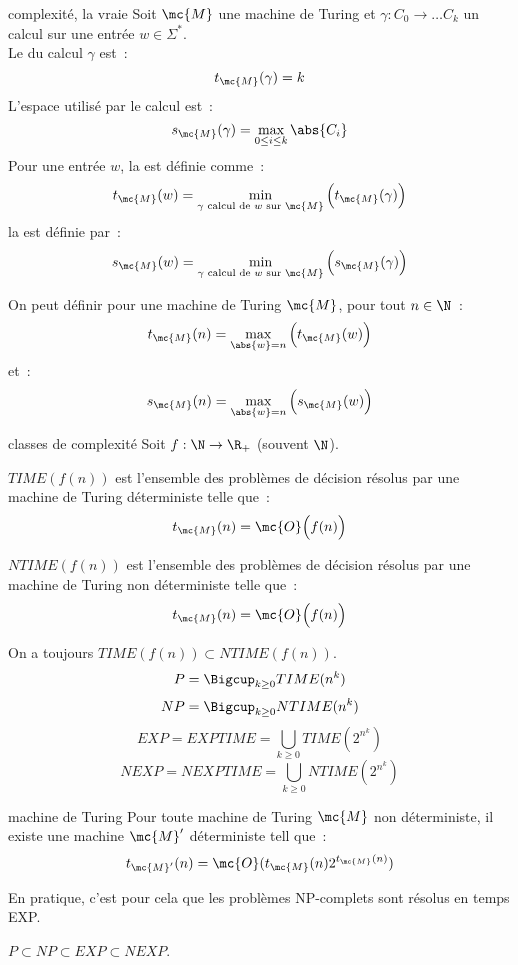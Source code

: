 \begin{definition}{}{complexité, la vraie}
    Soit $\mc{M}$ une machine de Turing et $\gamma : C_0 \to \dots C_k$ un calcul sur une entrée $w \in \Sigma^*$.\\
    Le  du calcul $\gamma$ est~:
    $$t_\mc{M}(\gamma) = k$$
    L'espace utilisé par le calcul est~:
    $$s_\mc{M}(\gamma) = \max_{0\leq i \leq k} \abs{C_i}$$
    Pour une entrée $w$, la  est définie comme~:
    $$t_\mc{M}(w) = \min_{\gamma \text{ calcul de $w$ sur $\mc{M}$}} \Big(t_\mc{M}(\gamma)\Big)$$
    la  est définie par~:
    $$s_\mc{M}(w) = \min_{\gamma \text{ calcul de $w$ sur $\mc{M}$}} \Big(s_\mc{M}(\gamma)\Big)$$
\end{definition}

\begin{remarque}{}{}
    On peut définir pour une machine de Turing $\mc{M}$, pour tout $n \in \N$~:
    $$t_\mc{M}(n) = \max_{\abs{w} = n}\Big(t_\mc{M}(w)\Big)$$
    et~:
    $$s_\mc{M}(n) = \max_{\abs{w} = n}\Big(s_\mc{M}(w)\Big)$$
\end{remarque}

\begin{definition}{}{classes de complexité}
    Soit $f : \N \to \R_+$ (souvent $\N$).
    \begin{enumeratebf}
        \item $TIME(f(n))$ est l'ensemble des problèmes de décision résolus par une machine de Turing déterministe telle que~:
         $$t_\mc{M}(n) = \mc{O}\Big(f(n)\Big)$$
        \item $NTIME(f(n))$ est l'ensemble des problèmes de décision résolus par une machine de Turing non déterministe telle que~:
        $$t_\mc{M}(n) = \mc{O}\Big(f(n)\Big)$$
        \item On a toujours $TIME(f(n)) \subset NTIME(f(n))$.\\
        $$P = \Bigcup_{k \geq 0}TIME(n^k)$$
        $$NP = \Bigcup_{k \geq 0}NTIME(n^k)$$
        $$EXP = EXPTIME = \bigcup_{k \geq 0} TIME(2^{n^k})$$
        $$NEXP = NEXPTIME = \bigcup_{k \geq 0} NTIME(2^{n^k})$$
    \end{enumeratebf} 
\end{definition}

\begin{proposition}{}{machine de Turing}
    Pour toute machine de Turing $\mc{M}$ non déterministe, il existe une machine $\mc{M}'$ déterministe tell que~:
    $$t_{\mc{M}'}(n) = \mc{O}(t_\mc{M}(n)2^{t_\mc{M}(n)})$$
\end{proposition}

\begin{remarque}{}{}
    En pratique, c'est pour cela que les problèmes NP-complets sont résolus en temps EXP.
\end{remarque}

\begin{proposition}{}{}
    $P \subset NP \subset EXP \subset NEXP$.
\end{proposition}



